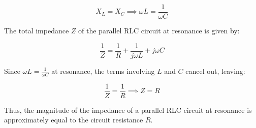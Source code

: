 \[
X_L = X_C \implies \omega L = \frac{1}{\omega C}
\]

The total impedance \( Z \) of the parallel RLC circuit at resonance is given by:

\[
\frac{1}{Z} = \frac{1}{R} + \frac{1}{j\omega L} + j\omega C
\]

Since \( \omega L = \frac{1}{\omega C} \) at resonance, the terms involving \( L \) and \( C \) cancel out, leaving:

\[
\frac{1}{Z} = \frac{1}{R} \implies Z = R
\]

Thus, the magnitude of the impedance of a parallel RLC circuit at resonance is approximately equal to the circuit resistance \( R \).

